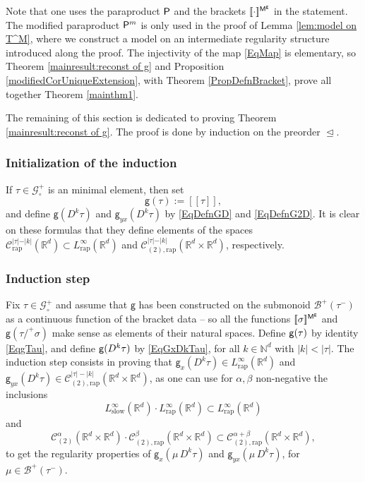 \documentclass[10pt]{amsart}
\theoremstyle{plain}
\theoremstyle{definition}
\newcommand{\Brac}[1]{[\![#1]\!]}
\newcommand{\rap}{\mathrm{rap}}
\newcommand{\slow}{\mathrm{slow}}
\newcommand{\sfg}{\mathsf{g}}
\let\pord\trianglelefteq
\newcommand{\bbN}{\mathbb{N}}
\newcommand{\bbR}{\mathbb{R}}
\newcommand{\mcB}{\mathcal{B}}
\newcommand{\mcC}{\mathcal{C}}
\newcommand{\mcG}{\mathcal{G}}
\begin{document}
Note that one uses the paraproduct $\sf P$ and the brackets $\Brac{\cdot}^{\sf M^g}$ in the statement. The modified paraproduct ${\sf P}^m$ is only used in the proof of Lemma \ref{lem:model on T^M}, where we construct a model on an intermediate regularity structure introduced along the proof. The injectivity of the map \eqref{EqMap} is elementary, so Theorem \ref{mainresult:reconst of g} and Proposition \ref{modifiedCorUniqueExtension}, with Theorem \ref{PropDefnBracket}, prove all together Theorem \ref{mainthm1}.

The remaining of this section is dedicated to proving Theorem \ref{mainresult:reconst of g}. The proof is done by induction on the preorder $\pord$.

\subsubsection*{Initialization of the induction}
If $\tau\in\mcG_\circ^+$ is an minimal element, then set
\[
\sfg(\tau) := \Brac{\tau},
\]
and define $\sfg(D^k\tau)$ and $\sfg_{yx}(D^k\tau)$ by \eqref{EqDefnGD} and \eqref{EqDefnG2D}. It is clear on these formulas that they define elements of the spaces $\mcC^{\vert\tau\vert-\vert k\vert}_\rap(\bbR^d)\subset L^\infty_\rap(\bbR^d)$ and $\mcC^{\vert\tau\vert-\vert k\vert}_{(2),\rap}(\bbR^d\times\bbR^d)$, respectively.

\subsubsection*{Induction step}
Fix $\tau\in\mcG_\circ^+$ and assume that $\sfg$ has been constructed on the submonoid $\mcB^+(\tau^-)$ as a continuous function of the bracket data -- so all the functions $\Brac{\sigma}^{{\sf M}^\sfg}$ and ${\sfg}(\tau/^+\sigma)$ make sense as elements of their natural spaces. Define ${\sf g}(\tau)$ by identity \eqref{EqgTau}, and define ${\sf g}(D^k\tau)$ by \eqref{EqGxDkTau}, for all $k\in\bbN^d$ with $\vert k\vert<\vert\tau\vert$. The induction step consists in proving that $\sfg_x(D^k\tau)\in L_\rap^\infty(\bbR^d)$ and ${\sfg}_{yx}(D^k\tau)\in\mcC^{|\tau|-|k|}_{(2),\rap}(\bbR^d\times\bbR^d)$, as one can use for $\alpha,\beta$ non-negative the inclusions
\[
L_\slow^\infty(\bbR^d)\cdot L_\rap^\infty(\bbR^d)\subset L_\rap^\infty(\bbR^d)
\]
and
\[
\mcC_{(2)}^\alpha(\bbR^d\times\bbR^d)\cdot\mcC_{(2),\rap}^\beta(\bbR^d\times\bbR^d)\subset\mcC_{(2),\rap}^{\alpha+\beta}(\bbR^d\times\bbR^d),
\]
to get the regularity properties of $\sfg_x(\mu\,D^k\tau)$ and $\sfg_{yx}(\mu\,D^k\tau)$, for $\mu\in\mcB^+(\tau^-)$.
\end{document}
